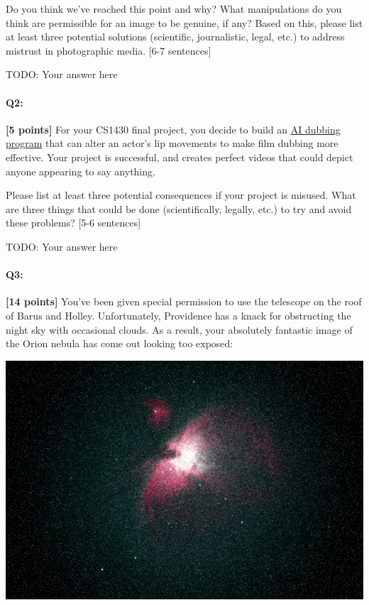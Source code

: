 Do you think we've reached this point and why? What manipulations do you think are permissible for an image to be genuine, if any? Based on this, please list at least three potential solutions (scientific, journalistic, legal, etc.) to address mistrust in photographic media. [6-7 sentences]
\begin{mdframed}
        TODO: Your answer here
    \end{mdframed}

\pagebreak
\paragraph{Q2:} \textbf{[5 points]} For your CS1430 final project, you decide to build an \href{https://respeecher.medium.com/what-is-synthetic-film-dubbing-ai-deepfake-technology-explained-9f6118532e8c}{AI dubbing program} that can alter an actor's lip movements to make film dubbing more effective. Your project is successful, and creates perfect videos that could depict anyone appearing to say anything.

Please list at least three potential consequences if your project is misused. What are three things that could be done (scientifically, legally, etc.) to try and avoid these problems? [5-6 sentences]
\begin{mdframed}
        TODO: Your answer here
    \end{mdframed}

\pagebreak

\paragraph{Q3:} \textbf{[14 points]} You've been given special permission to use the telescope on the roof of Barus and Holley. Unfortunately, Providence has a knack for obstructing the night sky with occasional clouds. As a result, your absolutely fantastic image of the Orion nebula has come out looking too exposed:

\includegraphics[width=\textwidth * 5/10]{images/orion-noise.png}


